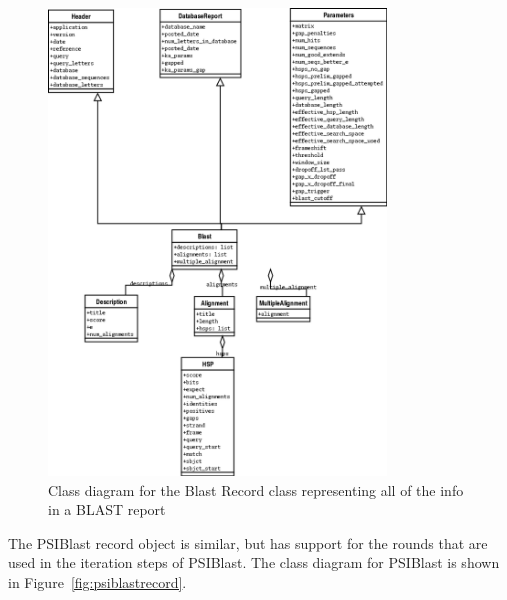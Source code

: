 \documentclass{article}
\begin{document}
\begin{latexonly}
\begin{figure}[htbp]
\centering
\includegraphics[width=0.8\textwidth]{images/BlastRecord.png}
\caption{Class diagram for the Blast Record class representing all of the info in a BLAST report}
\label{fig:blastrecord}
\end{figure}
\end{latexonly}

The PSIBlast record object is similar, but has support for the rounds that are used in the iteration steps of PSIBlast. The class diagram for PSIBlast is shown in Figure~\ref{fig:psiblastrecord}.

\begin{htmlonly}
\label{fig:psiblastrecord}
\end{htmlonly}
\end{document}
